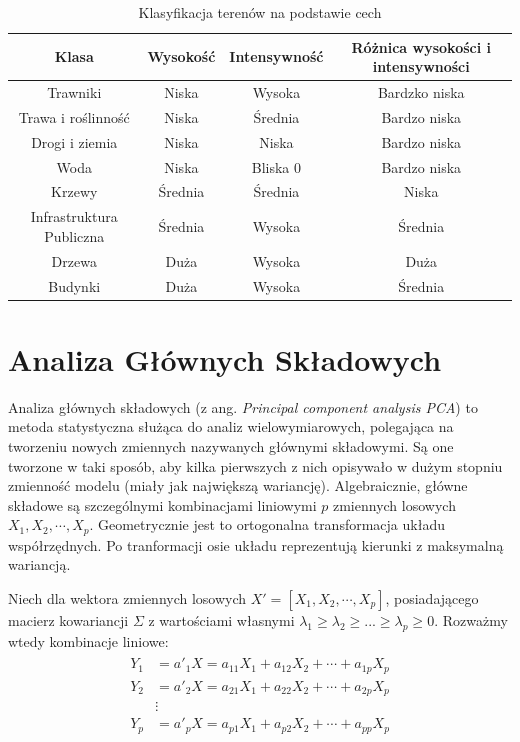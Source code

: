 \begin{table}[h!]
    \centering
    \caption{Klasyfikacja terenów na podstawie cech}
    \label{tab:przypisanie_do_klas}
    \begin{tabular}{|c|c|c|c|}
        \hline
        Klasa & Wysokość & Intensywność & Różnica wysokości i intensywności\\
        \hline
        Trawniki & Niska & Wysoka & Bardzko niska\\
        \hline
        Trawa i roślinność & Niska & Średnia & Bardzo niska\\
        \hline
        Drogi i ziemia & Niska & Niska & Bardzo niska\\
        \hline
        Woda & Niska & Bliska 0 & Bardzo niska\\
        \hline
        Krzewy & Średnia & Średnia & Niska\\
        \hline
        Infrastruktura Publiczna & Średnia & Wysoka & Średnia\\
        \hline
        Drzewa & Duża & Wysoka & Duża\\
        \hline
        Budynki & Duża & Wysoka & Średnia\\
        \hline
    \end{tabular}
\end{table}

\section{Analiza Głównych Składowych}

Analiza głównych składowych (z ang. \textit{Principal component analysis PCA}) to metoda statystyczna służąca do analiz wielowymiarowych, polegająca na tworzeniu nowych zmiennych nazywanych głównymi składowymi.
Są one tworzone w taki sposób, aby kilka pierwszych z nich opisywało w dużym stopniu zmienność modelu (miały jak największą wariancję). Algebraicznie, główne składowe są szczególnymi kombinacjami liniowymi $p$
zmiennych losowych $X_{1}, X_{2}, \cdots, X_{p}$. Geometrycznie jest to ortogonalna transformacja układu współrzędnych. Po tranformacji osie układu reprezentują kierunki
z maksymalną wariancją\cite{johnson2002}.

Niech dla wektora zmiennych losowych $X'=[X_{1}, X_{2}, \cdots, X_{p}]$, posiadającego macierz kowariancji $\Sigma$ z wartościami własnymi $\lambda_{1} \geqslant \lambda_{2} \geqslant ... \geqslant \lambda_{p}
\geqslant 0$. Rozważmy wtedy kombinacje liniowe:
\begin{align}
    \begin{split}
        Y_{1} &= a'_{1}X = a_{11}X_{1} + a_{12}X_{2} + \cdots + a_{1p}X_{p} \\
        Y_{2} &= a'_{2}X = a_{21}X_{1} + a_{22}X_{2} + \cdots + a_{2p}X_{p} \\
        &\vdots \\
        Y_{p} &= a'_{p}X = a_{p1}X_{1} + a_{p2}X_{2} + \cdots + a_{pp}X_{p}
    \end{split}
\end{align}

